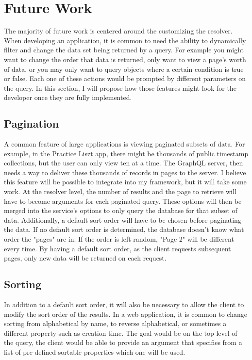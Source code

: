 \section{Future Work}

The majority of future work is centered around the customizing the resolver.  When developing an application, it is common to need the ability to dynamically filter and change the data set being returned by a query.  For example you might want to change the order that data is returned, only want to view a page's worth of data, or you may only want to query objects where a certain condition is true or false.  Each one of these actions would be prompted by different parameters on the query.  In this section, I will propose how those features might look for the developer once they are fully implemented.

\subsection{Pagination}

A common feature of large applications is viewing paginated subsets of data.  For example, in the Practice Liszt app, there might be thousands of public timestamp collections, but the user can only view ten at a time.  The GraphQL server, then needs a way to deliver these thousands of records in pages to the server.  I believe this feature will be possible to integrate into my framework, but it will take some work.  At the resolver level, the number of results and the page to retrieve will have to become arguments for each paginated query. These options will then be merged into the service's options to only query the database for that subset of data.  Additionally, a default sort order will have to be chosen before paginating the data.  If no default sort order is determined, the database doesn't know what order the "pages" are in.  If the order is left random, "Page 2" will be different every time.  By having a default sort order, as the client requests subsequent pages, only new data will be returned on each request.

\subsection{Sorting}

In addition to a default sort order, it will also be necessary to allow the client to modify the sort order of the results.  In a web application, it is common to change sorting from alphabetical by name, to reverse alphabetical, or sometimes a different property such as creation time.  The goal would be on the top level of the query, the client would be able to provide an argument that specifies from a list of pre-defined sortable properties which one will be used.

